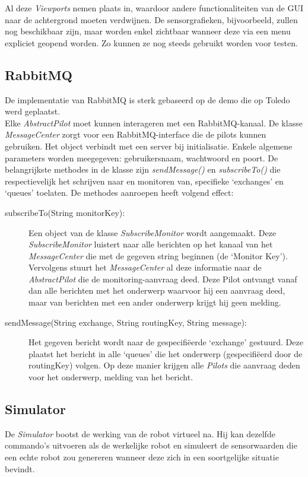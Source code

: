 \documentclass[tt2]{penoverslag}
\begin{document}
Al deze \textit{Viewports} nemen plaats in, waardoor andere functionaliteiten van de GUI naar de achtergrond moeten verdwijnen. De sensorgrafieken, bijvoorbeeld, zullen nog beschikbaar zijn, maar worden enkel zichtbaar wanneer deze via een menu expliciet geopend worden. Zo kunnen ze nog steeds gebruikt worden voor testen.



\subsection{RabbitMQ}
\label{ssec:RabbMQ}
De implementatie van RabbitMQ \cite{RabbitMQ} is sterk gebaseerd op de demo die op Toledo werd geplaatst.\\

Elke \textit{AbstractPilot} moet kunnen interageren met een RabbitMQ-kanaal. De klasse \textit{MessageCenter} zorgt voor een RabbitMQ-interface die de pilots kunnen gebruiken. Het object verbindt met een server bij initialisatie. Enkele algemene parameters worden meegegeven: gebruikersnaam, wachtwoord en poort. De belangrijkste methodes in de klasse zijn \textit{sendMessage()} en \textit{subscribeTo()} die respectievelijk het schrijven naar en monitoren van, specifieke `exchanges' en `queues' toelaten. De methodes aanroepen heeft volgend effect:

\begin{description}
\item[subscribeTo(String monitorKey):] Een object van de klasse \textit{SubscribeMonitor} wordt aangemaakt. Deze \textit{SubscribeMonitor} luistert naar alle berichten op het kanaal van het \textit{MessageCenter} die met de gegeven string beginnen (de `Monitor Key'). Vervolgens stuurt het \textit{MessageCenter} al deze informatie naar de \textit{AbstractPilot} die de monitoring-aanvraag deed. Deze Pilot ontvangt vanaf dan alle berichten met het onderwerp waarvoor hij een aanvraag deed, maar van berichten met een ander onderwerp krijgt hij geen melding.
\item[sendMessage(String exchange, String routingKey, String message):] Het gegeven bericht wordt naar de gespecifi\"eerde `exchange' gestuurd. Deze plaatst het bericht in alle `queues' die het onderwerp (gespecifi\"eerd door de routingKey) volgen. Op deze manier krijgen alle \textit{Pilots} die aanvraag deden voor het onderwerp, melding van het bericht.
\end{description}

\subsection{Simulator}
\label{ssec:Sim}
De \textit{Simulator} bootst de werking van de robot virtueel na. Hij kan dezelfde commando's uitvoeren als de werkelijke robot en simuleert de sensorwaarden die een echte robot zou genereren wanneer deze zich in een soortgelijke situatie bevindt.\\
\end{document}
